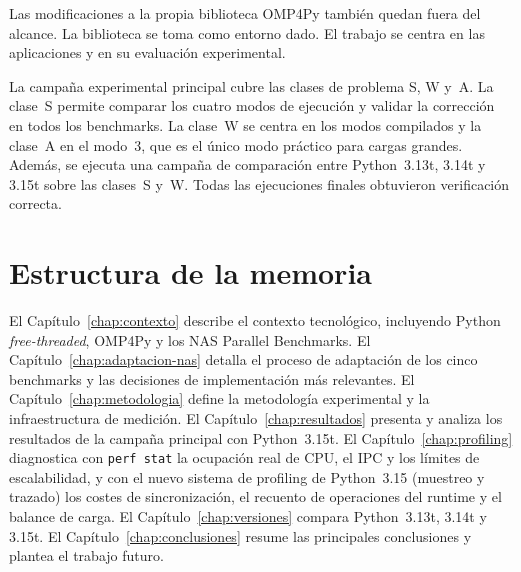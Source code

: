 Las modificaciones a la propia biblioteca OMP4Py también quedan fuera del
alcance. La biblioteca se toma como entorno dado. El trabajo se centra en las
aplicaciones y en su evaluación experimental.

La campaña experimental principal cubre las clases de problema S, W y~A. La
clase~S permite comparar los cuatro modos de ejecución y validar la corrección
en todos los benchmarks. La clase~W se centra en los modos compilados y la
clase~A en el modo~3, que es el único modo práctico para cargas grandes. Además,
se ejecuta una campaña de comparación entre Python~3.13t, 3.14t y 3.15t sobre
las clases~S y~W. Todas las ejecuciones finales obtuvieron verificación
correcta.


\section{Estructura de la memoria}
\label{sec:estructura}

El Capítulo~\ref{chap:contexto} describe el contexto tecnológico, incluyendo Python
\emph{free-threaded}, OMP4Py y los NAS Parallel Benchmarks. El
Capítulo~\ref{chap:adaptacion-nas} detalla el proceso de adaptación de los cinco
benchmarks y las decisiones de implementación más relevantes. El
Capítulo~\ref{chap:metodologia} define la metodología experimental y la
infraestructura de medición. El Capítulo~\ref{chap:resultados} presenta y analiza
los resultados de la campaña principal con Python~3.15t. El
Capítulo~\ref{chap:profiling} diagnostica con \texttt{perf stat} la ocupación
real de CPU, el IPC y los límites de escalabilidad, y con el nuevo sistema de
profiling de Python~3.15 (muestreo y trazado) los costes de sincronización, el
recuento de operaciones del runtime y el balance de carga. El
Capítulo~\ref{chap:versiones} compara Python~3.13t, 3.14t y 3.15t. El
Capítulo~\ref{chap:conclusiones} resume las principales conclusiones y plantea el trabajo
futuro.

